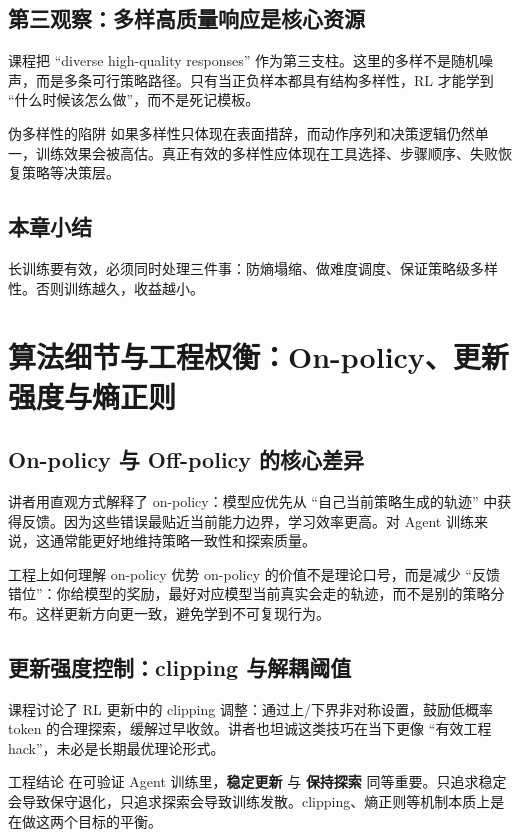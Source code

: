 \documentclass[a4paper]{article}
\begin{document}
\subsection{第三观察：多样高质量响应是核心资源}
课程把 ``diverse high-quality responses'' 作为第三支柱。这里的多样不是随机噪声，而是多条可行策略路径。只有当正负样本都具有结构多样性，RL 才能学到 ``什么时候该怎么做''，而不是死记模板。

\begin{warningbox}{伪多样性的陷阱}
如果多样性只体现在表面措辞，而动作序列和决策逻辑仍然单一，训练效果会被高估。真正有效的多样性应体现在工具选择、步骤顺序、失败恢复策略等决策层。
\end{warningbox}

\subsection{本章小结}
长训练要有效，必须同时处理三件事：防熵塌缩、做难度调度、保证策略级多样性。否则训练越久，收益越小。

\section{算法细节与工程权衡：On-policy、更新强度与熵正则}

\subsection{On-policy 与 Off-policy 的核心差异}
讲者用直观方式解释了 on-policy：模型应优先从 ``自己当前策略生成的轨迹'' 中获得反馈。因为这些错误最贴近当前能力边界，学习效率更高。对 Agent 训练来说，这通常能更好地维持策略一致性和探索质量。

\begin{knowledgebox}{工程上如何理解 on-policy 优势}
on-policy 的价值不是理论口号，而是减少 ``反馈错位''：你给模型的奖励，最好对应模型当前真实会走的轨迹，而不是别的策略分布。这样更新方向更一致，避免学到不可复现行为。
\end{knowledgebox}

\subsection{更新强度控制：clipping 与解耦阈值}
课程讨论了 RL 更新中的 clipping 调整：通过上/下界非对称设置，鼓励低概率 token 的合理探索，缓解过早收敛。讲者也坦诚这类技巧在当下更像 ``有效工程 hack''，未必是长期最优理论形式。

\begin{importantbox}{工程结论}
在可验证 Agent 训练里，\textbf{稳定更新} 与 \textbf{保持探索} 同等重要。只追求稳定会导致保守退化，只追求探索会导致训练发散。clipping、熵正则等机制本质上是在做这两个目标的平衡。
\end{importantbox}
\end{document}
